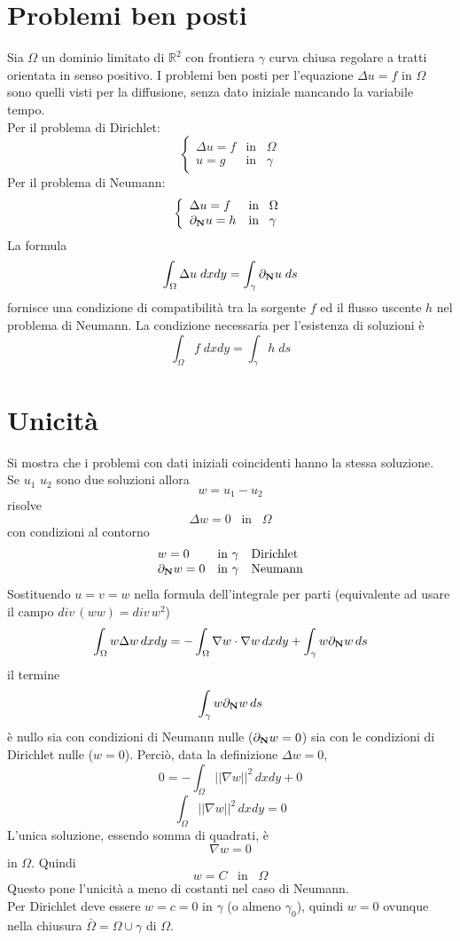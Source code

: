 \section{Problemi ben posti}
Sia $\Omega$ un dominio limitato di $\mathbb{R}^2$ con frontiera $\gamma$
curva chiusa regolare a tratti orientata in senso positivo.
I problemi ben posti per l'equazione $\Delta u= f$ in $\Omega$ sono quelli
visti per la diffusione, senza dato iniziale mancando la variabile tempo.\\
Per il problema di Dirichlet:
\[
	\left\{
	\begin{array}{ll}
		\Delta u= f & \text{in} \;\;\; \Omega \\
		u= g & \text{in} \;\;\; \gamma
	\end{array}
	\right.
\]
Per il problema di Neumann:
\[
	\left\{
	\begin{array}{ll}
		\Delta u= f & \text{in} \;\;\; \Omega \\
		\partial_{\bf N}u= h & \text{in} \;\;\; \gamma
	\end{array}
	\right.
\]
La formula
\[
	\int_{\Omega} \Delta u \; dxdy=
	\int_{\gamma} \partial_{\bf N} u \; ds
\]
fornisce una condizione di compatibilit\`a tra la sorgente $f$ ed il flusso
uscente $h$ nel problema di Neumann. La condizione necessaria per l'esistenza
di soluzioni \`e
\[
	\int_{\Omega} f \; dxdy=
	\int_{\gamma} h \; ds
\]

\section{Unicit\`a}
Si mostra che i problemi con dati iniziali coincidenti hanno la stessa
soluzione.\\
Se $u_1$ $u_2$ sono due soluzioni allora
\[
	w=u_1- u_2
\]
risolve
\[
	\Delta w = 0 \;\;\; \text{in} \;\;\; \Omega
\]
con condizioni al contorno
\[
	\begin{array}{lll}
		w=0 & \text{in } \gamma & \text{Dirichlet}\\
		\partial_{\bf N}w=0 & \text{in } \gamma & \text{Neumann}\\
	\end{array}
\]
Sostituendo $u=v=w$ nella formula dell'integrale per parti
(equivalente ad usare il campo $div\, (ww)= div\, w^2$)
\[
	\int_{\Omega} w \Delta w \, dxdy=
	- \int_{\Omega} \nabla w \cdot \nabla w \, dxdy
	+ \int_{\gamma} w \partial_{\bf N} w \, ds
\]
il termine
\[
	\int_{\gamma} w \partial_{\bf N} w \, ds
\]
\`e nullo sia con condizioni di Neumann nulle ($\partial_{\bf N} w =0 $) sia
con le condizioni di Dirichlet nulle ($w=0$).
Perci\`o, data la definizione $\Delta w= 0$,
\[
	0= - \int_{\Omega} \left|\left| \nabla w \right|\right|^2 \, dxdy +0
\]
\[
	\int_{\Omega} \left|\left| \nabla w \right|\right|^2 \, dxdy = 0
\]
L'unica soluzione, essendo somma di quadrati, \`e
\[
	\nabla w=0
\]
in $\Omega$. Quindi
\[
	w=C \;\;\; \text{in} \;\;\; \Omega
\]
Questo pone l'unicit\`a a meno di costanti nel caso di Neumann.\\
Per Dirichlet deve essere $w=c=0$ in $\gamma$ (o almeno $\gamma_0$),
quindi $w=0$ ovunque nella chiusura $\bar{\Omega}= \Omega \cup \gamma$ di
$\Omega$.
